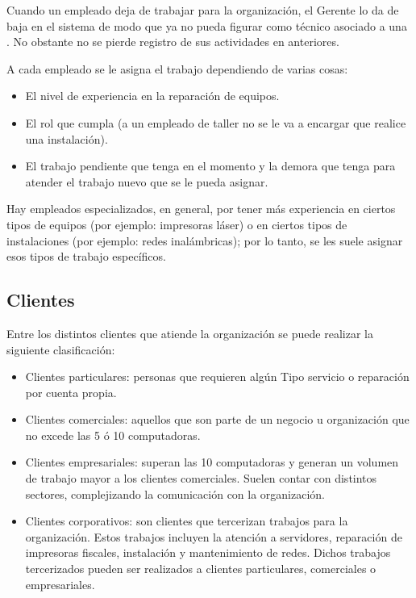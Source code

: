 \documentclass[12pt]{extarticle}
\begin{document}
\begin{spacing}{1.2}
    Cuando un empleado deja de trabajar para la organización, el Gerente lo da de baja en el sistema de modo que ya no pueda figurar como técnico asociado a una \OT{}. No obstante no se pierde registro de sus actividades en \OTs{} anteriores. 

    A cada empleado se le asigna el trabajo dependiendo de varias cosas:
    \begin{itemize}
        \item El nivel de experiencia en la reparación de equipos.
        \item El rol que cumpla (a un empleado de taller no se le va a encargar que realice una instalación).
        \item El trabajo pendiente que tenga en el momento y la demora que tenga para atender el trabajo nuevo que se le pueda asignar. 
    \end{itemize}

    Hay empleados especializados, en general, por tener más experiencia en ciertos tipos de equipos (por ejemplo: impresoras láser) o en ciertos tipos de instalaciones (por ejemplo: redes inalámbricas); por lo tanto, se les suele asignar esos tipos de trabajo específicos.

    \pagebreak
    \subsection{Clientes}

    Entre los distintos clientes que atiende la organización se puede realizar la siguiente clasificación:
    \begin{itemize}
        \item Clientes particulares: personas que requieren algún Tipo servicio o reparación por cuenta propia.
        \item Clientes comerciales: aquellos que son parte de un negocio u organización que no excede las 5 ó 10 computadoras.
        \item Clientes empresariales: superan las 10 computadoras y generan un volumen de trabajo mayor a los clientes comerciales. Suelen contar con distintos sectores, complejizando la comunicación con la organización.
        \item Clientes corporativos: son clientes que tercerizan trabajos para la organización. Estos trabajos incluyen la atención a servidores, reparación de impresoras fiscales, instalación y mantenimiento de redes. Dichos trabajos tercerizados pueden ser realizados a clientes particulares, comerciales o empresariales.
    \end{itemize}


\end{spacing}
\end{document}
